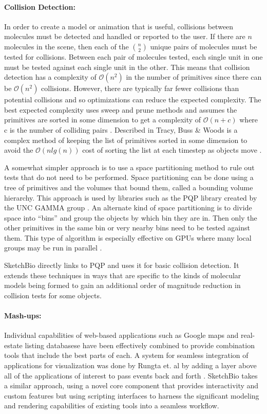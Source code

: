 \documentclass[twocolumn]{bmcart}%
\begin{document}
\paragraph*{Collision Detection:}
In order to create a model or animation that is useful, collisions between molecules must be detected and handled or reported to the user.
If there are $n$ molecules in the scene, then each of the $n\choose 2$ unique pairs of molecules must be tested for collisions.
Between each pair of molecules tested, each single unit in one must be tested against each single unit in the other.
This means that collision detection has a complexity of $\mathcal{O}(n^2)$ in the number of primitives since there can be $\mathcal{O}(n^2)$ collisions.
However, there are typically far fewer collisions than potential collisions and so optimizations can reduce the expected complexity.
The best expected complexity uses sweep and prune methods and assumes the primitives are sorted in some dimension to get a complexity of $\mathcal{O}(n + c)$ where c is the number of colliding pairs \cite{tracy2009efficient}.
Described in Tracy, Buss \& Woods is a complex method of keeping the list of primitives sorted in some dimension to avoid the $\mathcal{O}(n lg(n))$ cost of sorting the list at each timestep as objects move \cite{tracy2009efficient}.

A somewhat simpler approach is to use a space partitioning method to rule out tests that do not need to be performed.
Space partitioning can be done using a tree of primitives and the volumes that bound them, called a bounding volume hierarchy.
This approach is used by libraries such as the PQP library created by the UNC GAMMA group \cite{PQP}.
An alternate kind of space partitioning is to divide space into “bins” and group the objects by which bin they are in.
Then only the other primitives in the same bin or very nearby bins need to be tested against them.
This type of algorithm is especially effective on GPUs where many local groups may be run in parallel \cite{oat2008efficient}.

SketchBio directly links to PQP and uses it for basic collision detection.
It extends these techniques in ways that are specific to the kinds of molecular models being formed to gain an additional order of magnitude reduction in collision tests for some objects.

\paragraph*{Mash-ups:}
Individual capabilities of web-based applications such as Google maps and real-estate listing databasese have been effectively combined to provide combination tools that include the best parts of each.
A system for seamless integration of applications for visualization was done by Rungta et. al by adding a layer above all of the applications of interest to pass events back and forth \cite{rungta2013manyvis}.
SketchBio takes a similar approach, using a novel core component that provides interactivity and custom features but using scripting interfaces to harness the significant modeling and rendering capabilities of existing tools into a seamless workflow.
\end{document}
